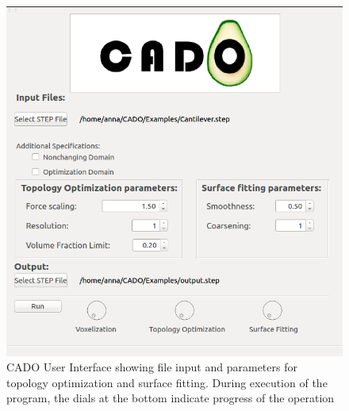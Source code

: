 \begin{figure}[h]
\centering
\includegraphics[scale=0.5]{Pictures/CADO_mainWindowParameters.png}
\caption{CADO User Interface showing file input and parameters for topology optimization and surface fitting. During execution of the program, the dials at the bottom indicate progress of the operation}
\label{fig:mainWindowParameters}
\end{figure}
